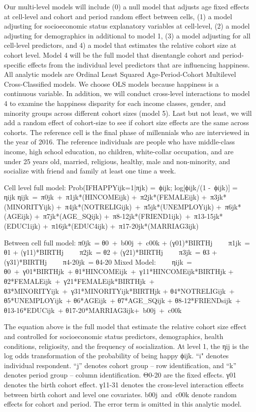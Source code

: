 Our multi-level models will include (0) a null model that adjusts age fixed effects at cell-level and cohort and period random effect between cells, (1) a model adjusting for socioeconomic status explanatory variables at cell-level, (2) a model adjusting for demographics in additional to model 1, (3) a model adjusting for all cell-level predictors, and 4) a model that estimates the relative cohort size at cohort level. Model 4 will be the full model that disentangle cohort and period-specific effects from the individual level predictors that are influencing happiness. All analytic models are Ordinal Least Squared Age-Period-Cohort Multilevel Cross-Classified models. We choose OLS models because happiness is a continuous variable. In addition, we will conduct cross-level interactions to model 4 to examine the happiness disparity for each income classes, gender, and minority groups across different cohort sizes (model 5). Last but not least, we will add a random effect of cohort-size to see if cohort size effects are the same across cohorts. The reference cell is the final phase of millennials who are interviewed in the year of 2016. The reference individuals are people who have middle-class income, high school education, no children, white-collar occupation, and are under 25 years old, married, religious, healthy, male and non-minority, and socialize with friend and family at least one time a week.

Cell level full model:
Prob(IFHAPPYijk=1|πjk) = ϕijk; log[ϕijk/(1 - ϕijk)] = ηijk ηijk = π0jk + π1jk*(HINCOMEijk) + π2jk*(FEMALEijk) + π3jk*(MINORITYijk) + π4jk*(NOTRELIGijk) + π5jk*(UNEMPLOYijk) + π6jk*(AGEijk) + π7jk*(AGE_SQijk) + π8-12jk*(FRIEND1ijk) + π13-15jk*(EDUC1ijk) + π16jk*(EDUC4ijk) + π17-20jk*(MARRIAG3ijk)

Between cell full model:
π0jk = θ0 + b00j + c00k + (γ01)*BIRTHj     π1jk = θ1 + (γ11)*BIRTHj     π2jk = θ2 + (γ21)*BIRTHj     π3jk = θ3 + (γ31)*BIRTHj     π4-20jk = θ4-20
Mixed Model:    
ηijk = θ0 + γ01*BIRTHjk + θ1*HINCOMEijk + γ11*HINCOMEijk*BIRTHjk + θ2*FEMALEijk + γ21*FEMALEijk*BIRTHjk + θ3*MINORITYijk + γ31*MINORITYijk*BIRTHjk + θ4*NOTRELIGijk + θ5*UNEMPLOYijk + θ6*AGEijk + θ7*AGE_SQijk + θ8-12*FRIENDsijk + θ13-16*EDUCijk + θ17-20*MARRIAG3ijk+ b00j + c00k

The equation above is the full model that estimate the relative cohort size effect and controlled for socioeconomic status predictors, demographics, health conditions, religiosity, and the frequency of socialization. At level 1, the ηij is the log odds transformation of the probability of being happy ϕijk. “i" denotes individual respondent. “j” denotes cohort group – row identification, and “k” denotes period group – column identification. Θ0-20 are the fixed effects. γ01 denotes the birth cohort effect. γ11-31 denotes the cross-level interaction effects between birth cohort and level one covariates. b00j and c00k denote random effects for cohort and period. The error term is omitted in this analytic model.

